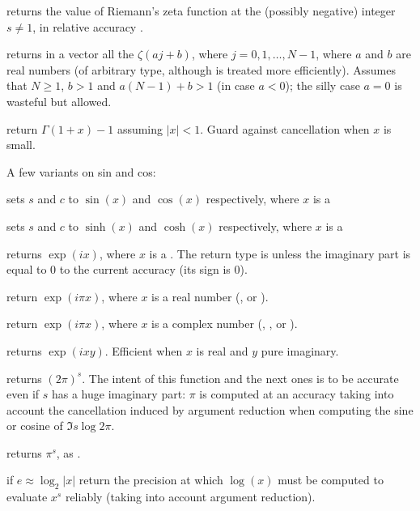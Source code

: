  returns the value of Riemann's zeta
function at the (possibly negative) integer $s\neq 1$, in relative accuracy
.

 returns in a vector
all the $\zeta(aj + b)$, where $j = 0, 1, \dots, N-1$, where $a$ and
$b$ are real numbers (of arbitrary type, although  is treated
more efficiently). Assumes that $N \geq 1$, $b > 1$ and $a(N-1) + b > 1$
(in case $a < 0$); the silly case $a = 0$ is wasteful but allowed.

 return $\Gamma(1+x) - 1$ assuming
$|x| < 1$. Guard against cancellation when $x$ is small.

\noindent A few variants on sin and cos:

 sets $s$ and $c$ to
$\sin(x)$ and $\cos(x)$ respectively, where $x$ is a 

 sets $s$ and $c$ to
$\sinh(x)$ and $\cosh(x)$ respectively, where $x$ is a 

 returns $\exp(ix)$, where $x$ is a .
The return type is  unless the imaginary part is equal to $0$
to the current accuracy (its sign is $0$).

 return $\exp(i \pi x)$, where $x$ is a
real number (,  or ).

 return $\exp(i \pi x)$, where $x$ is a
complex number (, ,  or ).

 returns $\exp(ixy)$. Efficient
when $x$ is real and $y$ pure imaginary.

 returns $(2\pi)^s$. The intent of this
function and the next ones is to be accurate even if $s$ has a huge imaginary
part: $\pi$ is computed at an accuracy taking into account the cancellation
induced by argument reduction when computing the sine or cosine of
$\Im s \log 2\pi$.

 returns $\pi^s$, as .

 if $e \approx \log_2 |x|$
return the precision at which $\log(x)$ must be computed to evaluate $x^s$
reliably (taking into account argument reduction).

